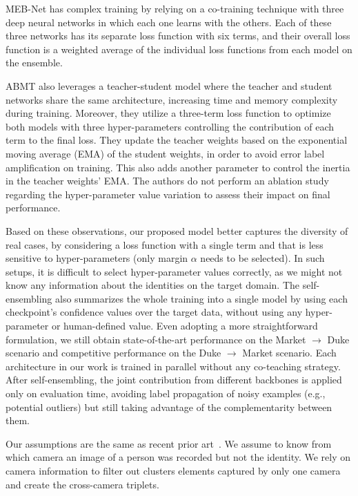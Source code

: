 \documentclass[journal]{IEEEtran}
\begin{document}
MEB-Net has complex training by relying on a co-training technique with three deep neural networks in which each one learns with the others. Each of these three networks has its separate loss function with six terms, and their overall loss function is a weighted average of the individual loss functions from each model on the ensemble. 

ABMT also leverages a teacher-student model where the teacher and student networks share the same architecture, increasing time and memory complexity during training. Moreover, they utilize a three-term loss function to optimize both models with three hyper-parameters controlling the contribution of each term to the final loss. They update the teacher weights based on the exponential moving average (EMA) of the student weights, in order to avoid error label amplification on training. This also adds another parameter to control the inertia in the teacher weights' EMA. The authors do not perform an ablation study regarding the hyper-parameter value variation to assess their impact on final performance. 

Based on these observations, our proposed model better captures the diversity of real cases, by considering a loss function with a single term and that is less sensitive to hyper-parameters (only margin $\alpha$ needs to be selected). In such setups, it is difficult to select hyper-parameter values correctly, as we might not know any information about the identities on the target domain. The self-ensembling also summarizes the whole training into a single model by using each checkpoint's confidence values over the target data, without using any hyper-parameter or human-defined value. Even adopting a more straightforward formulation, we still obtain state-of-the-art performance on the Market $ \rightarrow $ Duke scenario and competitive performance on the Duke $\rightarrow$ Market scenario. Each architecture in our work is trained in parallel without any co-teaching strategy. After self-ensembling, the joint contribution from different backbones is applied only on evaluation time, avoiding label propagation of noisy examples (e.g., potential outliers) but still taking advantage of the complementarity between them.

Our assumptions are the same as recent prior art~\cite{zhai2020ad, zhong2020learning, lin2020unsupervisedccse}. We assume to know from which camera an image of a person was recorded but not the identity. We rely on camera information to filter out clusters elements captured by only one camera and create the cross-camera triplets.
\end{document}
